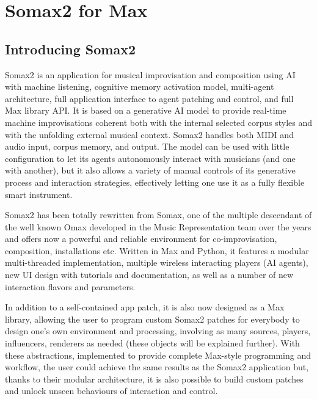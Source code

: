 \chapter{Somax2 for Max}\label{sec:introduction}

\section{Introducing Somax2}

Somax2 is an application for musical improvisation and composition using AI with machine listening, cognitive memory activation model, multi-agent architecture, full application interface to agent patching and control, and full Max library API. It is based on a generative AI model to provide real-time machine improvisations coherent both with the internal selected corpus styles and with the unfolding external musical context. Somax2 handles both MIDI and audio input, corpus memory, and output. The model can be used with little configuration to let its agents autonomously interact with musicians (and one with another), but it also allows a variety of manual controls of its generative process and interaction strategies, effectively letting one use it as a fully flexible smart instrument.


Somax2 has been totally rewritten from Somax, one of the multiple descendant of the well known Omax developed in the Music Representation team over the years and offers now a powerful and reliable environment for co-improvisation, composition, installations etc.
Written in Max and Python, it features a modular multi-threaded implementation, multiple wireless interacting players (AI agents), new UI design with tutorials and documentation, as well as a number of new interaction flavors and parameters.

In addition to a self-contained app patch, it is also now designed as a Max library, allowing the user to program custom Somax2 patches for everybody to design one's own environment and processing, involving as many sources, players, influencers, renderers as needed (these objects will be explained further). With these abstractions, implemented to provide complete Max-style programming and workflow, the user could achieve the same results as the Somax2 application but, thanks to their modular architecture, it is also possible to build custom patches and unlock unseen behaviours of interaction and control.

